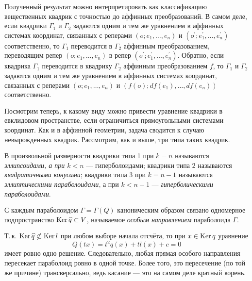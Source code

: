 Полученный результат можно интерпретировать как классификацию вещественных квадрик с точностью до аффинных преобразований. В самом деле, если квадрики $\Gamma_1$ и $\Gamma_2$ задаются одним и тем же уравнением в аффинных системах координат, связанных с реперами $(o; e_1, \ldots, e_n)$ и $(o^\prime; e_1^\prime, \ldots, e_n^\prime)$ соответственно, то $\Gamma_1$ переводится в $\Gamma_2$ аффинным преобразованием, переводящим репер $(o; e_1, \ldots, e_n)$ в репер $(o^\prime; e_1^\prime, \ldots, e_n^\prime)$. Обратно, если квадрика $\Gamma_1$ переводится в квадрику $\Gamma_2$ аффинным преобразованием $f$, то $\Gamma_1$ и $\Gamma_2$ задаются одним и тем же уравнением в аффинных системах координат, связанных с реперами $(o; e_1, \ldots, e_n)$ и $(f(o); df(e_1), \ldots, df(e_n))$ соответственно.

Посмотрим теперь, к какому виду можно привести уравнение квадрики в евклидовом пространстве, если ограничиться прямоугольными системами координат. Как и в аффинной геометрии, задача сводится к случаю невырожденных квадрик. Рассмотрим, как и выше, три типа таких квадрик.

\begin{definition}
    В произвольной размерности квадрики типа 1 при $k = n$ называются \textit{эллипсоидами, а при $k < n$} --- гиперболоидами; квадрики типа 2 называются \textit{квадратичными конусами}; квадрики типа 3 при $k = n - 1$ называются \textit{эллиптическими параболоидами}, а при $k < n - 1$ --- \textit{гиперболическими параболоидами}.
\end{definition}

\begin{definition}
    С каждым параболоидом $\Gamma = \Gamma(Q)$ каноническим образом связано одномерное подпространство $\operatorname{Ker} \widehat{q} \subset V$, называемое \textit{особым направлением} параболоида $\Gamma$.
\end{definition}

Т.\,к. $\operatorname{Ker} \widehat{q} \not\subset \operatorname{Ker} l$ при любом выборе начала отсчёта, то при $x \in \operatorname{Ker} q$ уравнение
\[
    Q(tx) = t^2q(x) + tl(x) + c = 0
\]
имеет ровно одно решение. Следовательно, любая прямая особого направления пересекает параболоид ровно в одной точке. Более того, это пересечение (по той же причине) трансверсально, ведь касание --- это на самом деле кратный корень.

